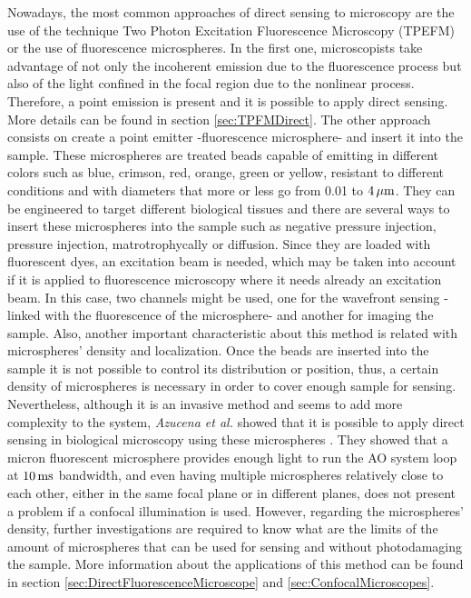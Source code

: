 Nowadays, the most common approaches of direct sensing to microscopy are the use of the technique Two Photon Excitation Fluorescence Microscopy (TPEFM) or the use of fluorescence microspheres. In the first one, microscopists take advantage of not only the incoherent emission due to the fluorescence process but also of the light confined in the focal region due to the nonlinear process. Therefore, a point emission is present and it is possible to apply direct sensing. More details can be found in section \ref{sec:TPFMDirect}. The other approach consists on create a point emitter -fluorescence microsphere- and insert it into the sample. These microspheres are treated beads capable of emitting in different colors such as blue, crimson, red, orange, green or yellow, resistant to different conditions and with diameters that more or less go from 0.01 to $\unit[4]{\mu m}$. They can be engineered to target different biological tissues and there are several ways to insert these microspheres into the sample such as negative pressure injection, pressure injection, matrotrophycally or diffusion. Since they are loaded with fluorescent dyes, an excitation beam is needed, which may be taken into account if it is applied to fluorescence microscopy where it needs already an excitation beam. In this case, two channels might be used, one for the wavefront sensing -linked with the fluorescence of the microsphere- and another for imaging the sample. Also, another important characteristic about this method is related with microspheres' density and localization. Once the beads are inserted into the sample it is not possible to control its distribution or position, thus, a certain density of microspheres is necessary in order to cover enough sample for sensing. Nevertheless, although it is an invasive method and seems to add more complexity to the system, \emph{Azucena et al.} showed that it is possible to apply direct sensing in biological microscopy using these microspheres \cite{wide_fluorescence_guide_star}. They showed that a micron fluorescent microsphere provides enough light to run the AO system loop at $\unit[10]{ms}$ bandwidth, and even having multiple microspheres relatively close to each other, either in the same focal plane or in different planes, does not present a problem if a confocal illumination is used. However, regarding the microspheres' density, further investigations are required to know what are the limits of the amount of microspheres that can be used for sensing and without photodamaging the sample. More information about the applications of this method can be found in section \ref{sec:DirectFluorescenceMicroscope} and \ref{sec:ConfocalMicroscopes}.        


